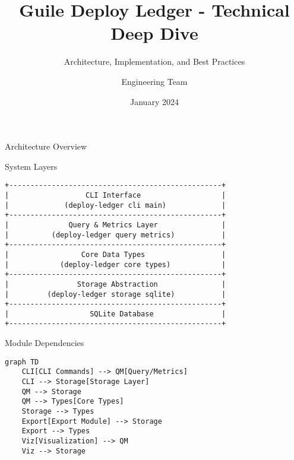 \documentclass[presentation,aspectratio=169]{beamer}
\author{Engineering Team}
\date{January 2024}
\title{Guile Deploy Ledger - Technical Deep Dive}
\subtitle{Architecture, Implementation, and Best Practices}
\begin{document}
\maketitle
\begin{frame}[label={sec:orgf81ae35},fragile]{Architecture Overview}
 \begin{block}{System Layers}
\begin{verbatim}
+--------------------------------------------------+
|                  CLI Interface                   |
|             (deploy-ledger cli main)             |
+--------------------------------------------------+
|              Query & Metrics Layer               |
|          (deploy-ledger query metrics)           |
+--------------------------------------------------+
|                 Core Data Types                  |
|            (deploy-ledger core types)            |
+--------------------------------------------------+
|                Storage Abstraction               |
|         (deploy-ledger storage sqlite)           |
+--------------------------------------------------+
|                   SQLite Database                |
+--------------------------------------------------+
\end{verbatim}
\end{block}
\begin{block}{Module Dependencies}
\begin{verbatim}
graph TD
    CLI[CLI Commands] --> QM[Query/Metrics]
    CLI --> Storage[Storage Layer]
    QM --> Storage
    QM --> Types[Core Types]
    Storage --> Types
    Export[Export Module] --> Storage
    Export --> Types
    Viz[Visualization] --> QM
    Viz --> Storage
\end{verbatim}
\end{block}
\end{frame}
\end{document}
